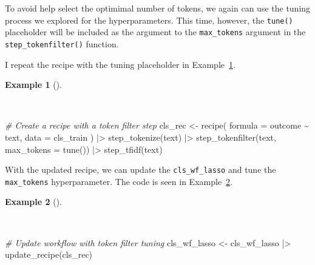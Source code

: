 \documentclass[
  letterpaper,
]{book}
\newenvironment{Shaded}{\begin{snugshade}}{\end{snugshade}}
\newcommand{\AttributeTok}[1]{\textcolor[rgb]{0.00,0.00,0.00}{#1}}
\newcommand{\CommentTok}[1]{\textcolor[rgb]{0.00,0.00,0.00}{\textit{#1}}}
\newcommand{\FunctionTok}[1]{\textcolor[rgb]{0.00,0.00,0.00}{#1}}
\newcommand{\NormalTok}[1]{\textcolor[rgb]{0.00,0.00,0.00}{#1}}
\newcommand{\OtherTok}[1]{\textcolor[rgb]{0.00,0.00,0.00}{#1}}
\newcommand{\SpecialCharTok}[1]{\textcolor[rgb]{0.00,0.00,0.00}{#1}}
\theoremstyle{definition}
\newtheorem{example}{Example}[chapter]
\theoremstyle{remark}
\begin{document}
To avoid help select the optimimal number of tokens, we again can use
the tuning process we explored for the hyperparameters. This time,
however, the \texttt{tune()} placeholder will be included as the
argument to the \texttt{max\_tokens} argument in the
\texttt{step\_tokenfilter()} function.

I repeat the recipe with the tuning placeholder in
Example~\ref{exm-predict-class-tune-hyperparameters-tokenfilter}.

\begin{example}[]\protect\hypertarget{exm-predict-class-tune-hyperparameters-tokenfilter}{}\label{exm-predict-class-tune-hyperparameters-tokenfilter}

~

\begin{Shaded}
\begin{Highlighting}[]
\CommentTok{\# Create a recipe with a token filter step}
\NormalTok{cls\_rec }\OtherTok{\textless{}{-}}
  \FunctionTok{recipe}\NormalTok{(}
    \AttributeTok{formula =}\NormalTok{ outcome }\SpecialCharTok{\textasciitilde{}}\NormalTok{ text,}
    \AttributeTok{data =}\NormalTok{ cls\_train}
\NormalTok{    ) }\SpecialCharTok{|\textgreater{}}
  \FunctionTok{step\_tokenize}\NormalTok{(text) }\SpecialCharTok{|\textgreater{}}
  \FunctionTok{step\_tokenfilter}\NormalTok{(text, }\AttributeTok{max\_tokens =} \FunctionTok{tune}\NormalTok{()) }\SpecialCharTok{|\textgreater{}}
  \FunctionTok{step\_tfidf}\NormalTok{(text)}
\end{Highlighting}
\end{Shaded}

\end{example}

With the updated recipe, we can update the \texttt{cls\_wf\_lasso} and
tune the \texttt{max\_tokens} hyperparameter. The code is seen in
Example~\ref{exm-predict-class-tune-hyperparameters-update-rec}.

\begin{example}[]\protect\hypertarget{exm-predict-class-tune-hyperparameters-update-rec}{}\label{exm-predict-class-tune-hyperparameters-update-rec}

~

\begin{Shaded}
\begin{Highlighting}[]
\CommentTok{\# Update workflow with token filter tuning}
\NormalTok{cls\_wf\_lasso }\OtherTok{\textless{}{-}}
\NormalTok{  cls\_wf\_lasso }\SpecialCharTok{|\textgreater{}}
  \FunctionTok{update\_recipe}\NormalTok{(cls\_rec)}
\end{Highlighting}
\end{Shaded}

\end{example}
\end{document}
